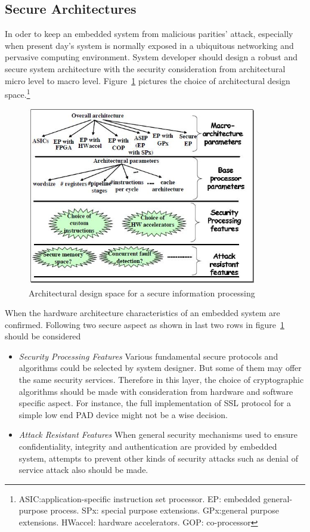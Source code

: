 \subsection{Secure Architectures}
In oder to keep an embedded system from malicious parities' attack, especially when present day's system is normally exposed in a ubiquitous networking and pervasive computing environment\cite{embedded_secure}. System developer should design a robust and secure system architecture with the security consideration from architectural micro level to macro level. Figure~\ref{fig:design-space} pictures the choice of architectural design space.\footnote{ASIC:application-specific instruction set processor. EP: embedded general-purpose process. SPx: special purpose extensions. GPx:general purpose extensions. HWaccel: hardware accelerators. GOP: co-processor}
\begin{figure}[htb]
	\centering
	\includegraphics[width=0.9\textwidth]{design-space.jpg}
		\caption{Architectural design space for a secure information processing\cite{embedded_secure}}
	\label{fig:design-space}
\end{figure}


When the hardware architecture characteristics of an embedded system are confirmed. Following two secure aspect as shown in last two rows in figure~\ref{fig:design-space} should be considered
\begin{itemize}
\item \emph{Security Processing Features} Various fundamental secure protocols and algorithms could be selected by system designer. But some of them may offer the same security services. Therefore in this layer, the choice of cryptographic algorithms should be made with consideration from hardware and software specific aspect. For instance, the full implementation of SSL protocol for a simple low end PAD device might not be a wise decision\cite{embedded_secure}.
\item \emph{Attack Resistant Features} When general security mechanisms used to ensure confidentiality, integrity and authentication are provided by embedded system, attempts to prevent other kinds of security attacks such as denial of service attack also should be made.
\end{itemize}